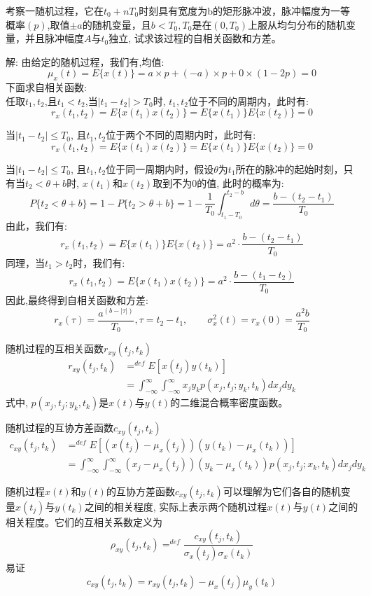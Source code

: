 \begin{frame}
\begin{example}
	考察一随机过程，它在$t_0+nT_0$时刻具有宽度为b的矩形脉冲波，脉冲幅度为一等概率$(p)$,取值$\pm a$的随机变量，且$b<T_0,T_0$是在$(0,T_0)$上服从均匀分布的随机变量，并且脉冲幅度$A$与$t_0$独立, 试求该过程的自相关函数和方差。
\end{example}
解: 由给定的随机过程，我们有,均值: 
$$\mu_x(t)=E\{x(t)\}=a\times p+(-a)\times p + 0\times(1-2p)=0$$
下面求自相关函数:\\
任取$t_1,t_2$,且$t_1<t_2$,当$|t_1-t_2|>T_0$时, $t_1,t_2$位于不同的周期内，此时有:
$$r_x(t_1,t_2)=E\{x(t_1)x(t_2)\}=E\{x(t_1)\}E\{x(t_2)\}=0$$

当$|t_1-t_2|\le T_0$, 且$t_1,t_2$位于两个不同的周期内时，此时有:
$$r_x(t_1,t_2)=E\{x(t_1)x(t_2)\}=E\{x(t_1)\}E\{x(t_2)\}=0$$
\end{frame}

\begin{frame}
当$|t_1-t_2|\le T_0$, 且$t_1,t_2$位于同一周期内时，假设$\theta$为$t_1$所在的脉冲的起始时刻，只有当$t_2<\theta+b$时, $x(t_1)和x(t_2)$取到不为0的值, 此时的概率为:
$$P\{t_2<\theta+b \}=1-P\{t_2>\theta+b\}=1-\frac{1}{T_0}\int_{t_1-T_0}^{t_2-b}d\theta=\frac{b-(t_2-t_1)}{T_0}$$
由此，我们有:
$$r_x(t_1,t_2)=E\{x(t_1)\}E\{x(t_2)\}=a^2\cdot\frac{b-(t_2-t_1)}{T_0}$$
同理，当$t_1>t_2$时，我们有:
$$r_x(t_1,t_2)=E\{x(t_1)x(t_2)\}=a^2\cdot\frac{b-(t_1-t_2)}{T_0}$$
因此,最终得到自相关函数和方差:
$$r_x(\tau)=\frac{a^(b-|\tau|)}{T_0},\tau=t_2-t_1,\qquad \sigma_x^2(t)=r_x(0)=\frac{a^2b}{T_0}$$
\end{frame}

\begin{frame}
\begin{block}{随机过程的互相关函数$r_{xy}(t_j,t_k)$}
\begin{align*}
r_{xy}(t_j,t_k) &\mathop{=}^{def}E[x(t_j)y(t_k)]\\
&=\int_{-\infty}^{\infty}\int_{-\infty}^{\infty}x_jy_kp(x_j,t_j;y_k,t_k)dx_jdy_k
\end{align*}
式中, $p(x_j,t_j;y_k,t_k)$是$x(t)$与$y(t)$的二维混合概率密度函数。
\end{block}
\end{frame}

\begin{frame}
\begin{block}{随机过程的互协方差函数$c_{xy}(t_j,t_k)$}
\begin{align*}
c_{xy}(t_j,t_k)&\mathop{=}^{def}E[(x(t_j)-\mu_x(t_j))(y(t_k)-\mu_x(t_k))]\\
&=\int_{-\infty}^{\infty}\int_{-\infty}^{\infty}(x_j-\mu_x(t_j))(y_k-\mu_x(t_k))p(x_j,t_j;x_k,t_k)dx_jdy_k
\end{align*}
\end{block}
随机过程$x(t)$和$y(t)$的互协方差函数$c_{xy}(t_j,t_k)$可以理解为它们各自的随机变量$x(t_j)$与$y(t_k)$之间的相关程度, 实际上表示两个随机过程$x(t)$与$y(t)$之间的相关程度。它们的互相关系数定义为
\[\rho_{xy}(t_j,t_k)\mathop{=}^{def}\frac{c_{xy}(t_j,t_k)}{\sigma_x(t_j)\sigma_x(t_k)}\]
易证
\[c_{xy}(t_j,t_k)=r_{xy}(t_j,t_k)-\mu_x(t_j)\mu_y(t_k)\]
\end{frame}

